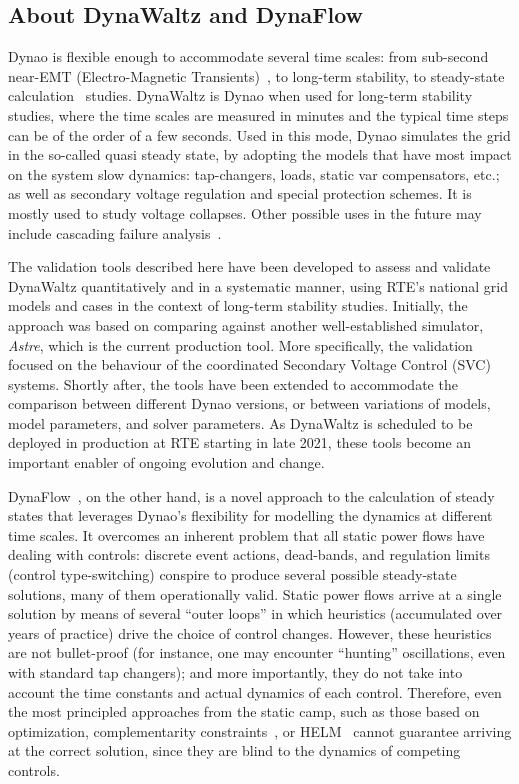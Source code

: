 \documentclass[conference]{IEEEtran}
\newcommand{\Dynawo}{Dyna\textomega o} %
\begin{document}
\subsection{About DynaWaltz and DynaFlow}

\Dynawo{} is flexible enough to accommodate several time scales: from sub-second
near-EMT (Electro-Magnetic Transients)~\cite{Masoon21}, to long-term stability,
to steady-state calculation~\cite{Cossart21} studies. DynaWaltz is \Dynawo{}
when used for long-term stability studies, where the time scales are measured in
minutes and the typical time steps can be of the order of a few seconds. Used in
this mode, \Dynawo{} simulates the grid in the so-called quasi steady state, by
adopting the models that have most impact on the system slow dynamics:
tap-changers, loads, static var compensators, etc.; as well as secondary voltage
regulation and special protection schemes. It is mostly used to study voltage
collapses. Other possible uses in the future may include cascading failure
analysis~\cite{Bialek16}.

The validation tools described here have been developed to assess and validate
DynaWaltz quantitatively and in a systematic manner, using RTE's national grid
models and cases in the context of long-term stability studies. Initially, the
approach was based on comparing against another well-established
simulator, \emph{Astre}, which is the current production tool. More
specifically, the validation focused on the behaviour of the coordinated
Secondary Voltage Control (SVC) systems. Shortly after, the tools have been
extended to accommodate the comparison between different \Dynawo{} versions, or
between variations of models, model parameters, and solver parameters. As
DynaWaltz is scheduled to be deployed in production at RTE starting in late
2021, these tools become an important enabler of ongoing evolution and change.

DynaFlow~\cite{Cossart21}, on the other hand, is a novel approach to the
calculation of steady states that leverages \Dynawo's flexibility for modelling
the dynamics at different time scales. It overcomes an inherent problem that all
static power flows have dealing with controls: discrete event actions,
dead-bands, and regulation limits (control type-switching) conspire to produce
several possible steady-state solutions, many of them operationally valid.
Static power flows arrive at a single solution by means of several ``outer
loops'' in which heuristics (accumulated over years of practice) drive the
choice of control changes. However, these heuristics are not bullet-proof (for
instance, one may encounter ``hunting'' oscillations, even with standard tap
changers); and more importantly, they do not take into account the time
constants and actual dynamics of each control. Therefore, even the most
principled approaches from the static camp, such as those based on
optimization\cite{Ju20}, complementarity constraints~\cite{Murray15}, or
HELM~\cite{Trias18} cannot guarantee arriving at the correct solution, since
they are blind to the dynamics of competing controls.
\end{document}
